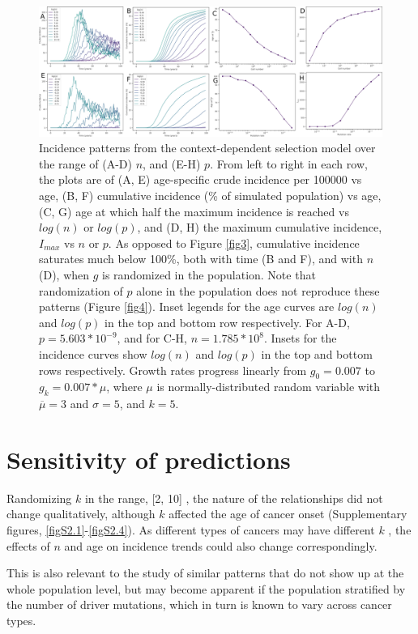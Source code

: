 \documentclass[10pt,twocolumn,twoside]{article}
\begin{document}
\begin{figure}[tbhp]
	\centering
	\includegraphics[width=\linewidth, keepaspectratio=true]{fig5.png}
	\caption{Incidence patterns from the context-dependent selection model over the range of (A-D) $n$, and (E-H) $p$. From left to right in each row, the plots are of (A, E) age-specific crude incidence per 100000 vs age, (B, F) cumulative incidence (\% of simulated population) vs age, (C, G) age at which half the maximum incidence is reached vs $log(n)$ or $log(p)$, and (D, H) the maximum cumulative incidence, $I_{max}$ vs $n$ or $p$. As opposed to Figure \ref{fig3}, cumulative incidence saturates much below 100\%, both with time (B and F), and with $n$ (D), when $g$ is randomized in the population. Note that randomization of $p$ alone in the population does not reproduce these patterns (Figure \ref{fig4}). Inset legends for the age curves are $log(n)$ and $log(p)$ in the top and bottom row respectively. For A-D, $p=5.603*10^{-9}$, and for C-H, $n=1.785*10^{8}$. Insets for the incidence curves show $log(n)$ and $log(p)$ in the top and bottom rows respectively. Growth rates progress linearly from $g_{0}=0.007$ to $g_{k}=0.007*\mu$, where $\mu$ is normally-distributed random variable with $\overline{\mu}=3$ and $\sigma=5$, and $k=5$.}
	\label{fig5}
\end{figure}


\section{Sensitivity of predictions}

Randomizing $k$ in the range, [2, 10] \cite{Martincorena2017}, the nature of the relationships did not change qualitatively, although $k$ affected the age of cancer onset (Supplementary figures, \ref{figS2.1}-\ref{figS2.4}). As different types of cancers may have different $k$ \cite{Nunney2015}, the effects of $n$ and age on incidence trends could also change correspondingly. 

This is also relevant to the study of similar patterns that do not show up at the whole population level, but may become apparent if the population stratified by the number of driver mutations, which in turn is known to vary across cancer types.
\end{document}
